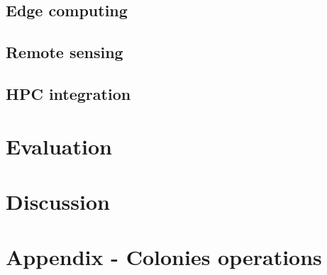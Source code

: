 \documentclass{article}
\begin{document}
\subsection{Edge computing}
\subsection{Remote sensing}
\subsection{HPC integration}

\section{Evaluation}
\section{Discussion}


 

\newpage
\appendix
\section{Appendix - Colonies operations}
\end{document}
